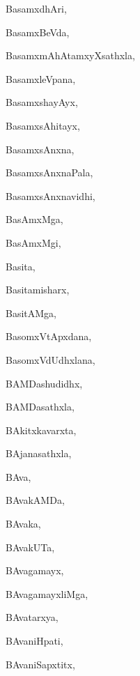 \begin{multicols}{3}
{\noindent
{BasamxdhAri}, \pageref{BasamxdhAri}

\noindent
{BasamxBeVda}, \pageref{BasamxBeVda}

\noindent
{BasamxmAhAtamxyXsathxla}, \pageref{BasamxmAhAtamxyXsathxla}

\noindent
{BasamxleVpana}, \pageref{BasamxleVpana}

\noindent
{BasamxshayAyx}, \pageref{BasamxshayAyx}

\noindent
{BasamxsAhitayx}, \pageref{BasamxsAhitayx}

\noindent
{BasamxsAnxna}, \pageref{BasamxsAnxna}

\noindent
{BasamxsAnxnaPala}, \pageref{BasamxsAnxnaPala}

\noindent
{BasamxsAnxnavidhi}, \pageref{BasamxsAnxnavidhi}

\noindent
{BasAmxMga}, \pageref{BasAmxMga}

\noindent
{BasAmxMgi}, \pageref{BasAmxMgi}

\noindent
{Basita}, \pageref{Basita}

\noindent
{Basitamisharx}, \pageref{Basitamisharx}

\noindent
{BasitAMga}, \pageref{BasitAMga}

\noindent
{BasomxVtApxdana}, \pageref{BasomxVtApxdana}

\noindent
{BasomxVdUdhxlana}, \pageref{BasomxVdUdhxlana}

\noindent
{BAMDashudidhx}, \pageref{BAMDashudidhx}

\noindent
{BAMDasathxla}, \pageref{BAMDasathxla}

\noindent
{BAkitxkavarxta}, \pageref{BAkitxkavarxta}

\noindent
{BAjanasathxla}, \pageref{BAjanasathxla}

\noindent
{BAva}, \pageref{BAva}

\noindent
{BAvakAMDa}, \pageref{BAvakAMDa}

\noindent
{BAvaka}, \pageref{BAvaka}

\noindent
{BAvakUTa}, \pageref{BAvakUTa}

\noindent
{BAvagamayx}, \pageref{BAvagamayx}

\noindent
{BAvagamayxliMga}, \pageref{BAvagamayxliMga}

\noindent
{BAvatarxya}, \pageref{BAvatarxya}

\noindent
{BAvaniHpati}, \pageref{BAvaniHpati}

\noindent
{BAvaniSapxtitx}, \pageref{BAvaniSapxtitx}

}
\end{multicols}
